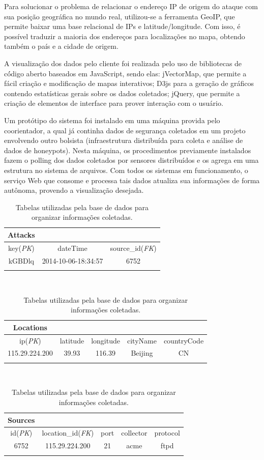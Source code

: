 \documentclass[Portuguese]
{ic-tese-v2}
\begin{document}
Para solucionar o problema de relacionar o endereço IP de origem do ataque com sua posição geográfica no mundo real, utilizou-se a ferramenta GeoIP\cite{geoip}, que permite baixar uma base relacional de IPs e latitude/longitude. Com isso, é possível traduzir a maioria dos endereços para localizações no mapa, obtendo também o país e a cidade de origem.

A visualização dos dados pelo cliente foi realizada pelo uso de bibliotecas de có́digo aberto baseados em JavaScript, sendo elas: jVectorMap\cite{jvectormap}, que permite a fácil criação e modificação de mapas interativos; D3js para a geração de gráficos contendo estatísticas gerais sobre os dados coletados; jQuery\cite{jquery}, que permite a criação de elementos de interface para prover interação com o usuário.

Um protótipo do sistema foi instalado em uma máquina provida pelo coorientador, a qual já continha dados de segurança coletados em um projeto envolvendo outro bolsista (infraestrutura distribuída para coleta e análise de dados de honeypots). Nesta máquina, os procedimentos previamente instalados fazem o polling dos dados coletados por sensores distribuídos e os agrega em uma estrutura no sistema de arquivos. Com todos os sistemas em funcionamento, o serviço Web que consome e processa tais dados atualiza sua informações de forma autônoma, provendo a visualização desejada.

\begin{table}
	\center
	\caption{Tabelas utilizadas pela base de dados para organizar informações coletadas.}
	\label{tab:db}
	\begin{tabular}{|c|c|c|}
		\cline{1-1}
		\textbf{Attacks} & \multicolumn{2}{l}{}\\
		\hline
		key(\emph{PK}) & dateTime 			& source\_id(\emph{FK})\\
		\hline
		kGBDlq 			 & 2014-10-06-18:34:57  & 6752\\
		\hline
		\multicolumn{3}{c}{}\\
	\end{tabular}
	\\
	\begin{tabular}{|c|c|c|c|c|}
		\cline{1-1}
		\textbf{Locations} & \multicolumn{4}{l}{}\\
		\hline
		ip(\emph{PK}) & latitude & longitude & cityName & countryCode\\
		\hline
		115.29.224.200 & 39.93 & 116.39 & Beijing & CN\\
		\hline
		\multicolumn{5}{c}{}\\
	\end{tabular}
	\\
	\begin{tabular}{|c|c|c|c|c|}
		\cline{1-1}
		\textbf{Sources} & \multicolumn{4}{l}{}\\
		\hline
		id(\emph{PK}) & location\_id(\emph{FK}) & port & collector & protocol\\
		\hline
		6752 & 115.29.224.200 & 21 & acme & ftpd\\
		\hline
		\multicolumn{5}{c}{}\\
	\end{tabular}
\end{table}
\end{document}
